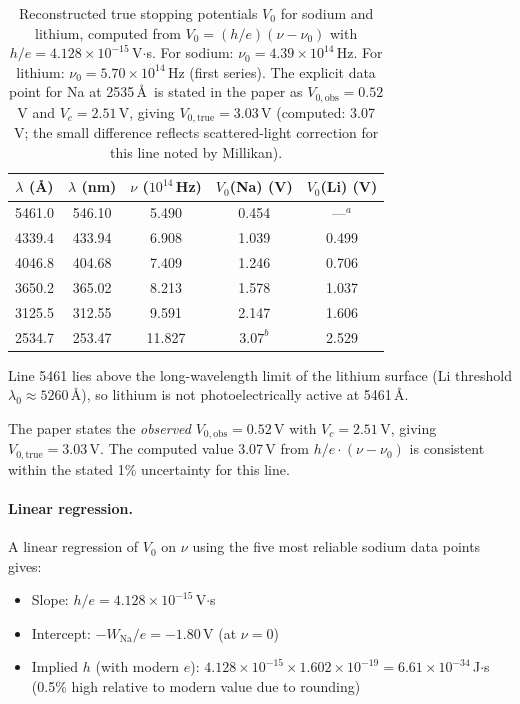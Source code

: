 \documentclass[12pt]{article}
\begin{document}
\begin{table}[ht]
\centering
\caption{Reconstructed true stopping potentials $V_0$ for sodium and lithium,
computed from $V_0 = (h/e)(\nu - \nu_0)$ with $h/e = 4.128\times10^{-15}$\,V$\cdot$s.
For sodium: $\nu_0 = 4.39\times10^{14}$\,Hz.  For lithium: $\nu_0 = 5.70\times10^{14}$\,Hz
(first series).  The explicit data point for Na at 2535\,\AA\ is stated in
the paper as $V_{0,\text{obs}} = 0.52$\,V and $V_c = 2.51$\,V, giving
$V_{0,\text{true}} = 3.03$\,V (computed: 3.07\,V; the small difference reflects
scattered-light correction for this line noted by Millikan).}
\label{tab:stopping_potentials}
\begin{tabular}{ccccc}
\toprule
$\lambda$ (\AA) & $\lambda$ (nm) & $\nu$ ($10^{14}$\,Hz)
  & $V_0$(Na) (V) & $V_0$(Li) (V) \\
\midrule
5461.0 & 546.10 & 5.490 & 0.454 & ---$^{a}$ \\
4339.4 & 433.94 & 6.908 & 1.039 & 0.499 \\
4046.8 & 404.68 & 7.409 & 1.246 & 0.706 \\
3650.2 & 365.02 & 8.213 & 1.578 & 1.037 \\
3125.5 & 312.55 & 9.591 & 2.147 & 1.606 \\
2534.7 & 253.47 & 11.827 & $3.07^{b}$ & 2.529 \\
\bottomrule
\end{tabular}
\begin{tablenotes}
  \footnotesize
  \item[$a$] Line 5461 lies above the long-wavelength limit of the
  lithium surface (Li threshold $\lambda_0\approx5260$\,\AA), so lithium
  is not photoelectrically active at 5461\,\AA.
  \item[$b$] The paper states the \emph{observed} $V_{0,\text{obs}} = 0.52$\,V
  with $V_c = 2.51$\,V, giving $V_{0,\text{true}} = 3.03$\,V.
  The computed value 3.07\,V from $h/e \cdot (\nu - \nu_0)$ is consistent
  within the stated 1\% uncertainty for this line.
\end{tablenotes}
\end{table}

\paragraph{Linear regression.}
A linear regression of $V_0$ on $\nu$ using the five most reliable
sodium data points gives:
\begin{itemize}
  \item Slope: $h/e = 4.128\times10^{-15}$\,V$\cdot$s
  \item Intercept: $-W_{\text{Na}}/e = -1.80$\,V (at $\nu = 0$)
  \item Implied $h$ (with modern $e$): $4.128\times10^{-15}\times1.602\times10^{-19}
    = 6.61\times10^{-34}$\,J$\cdot$s (0.5\% high relative to modern value
    due to rounding)
\end{itemize}
\end{document}
